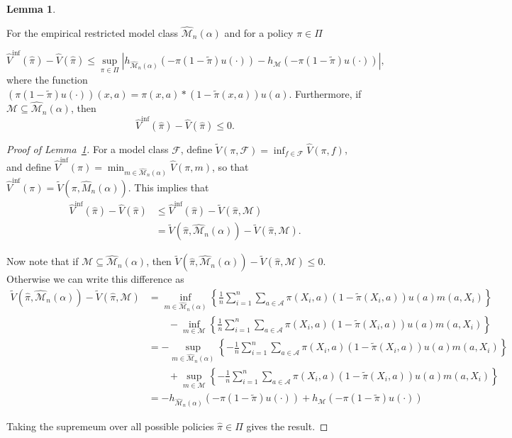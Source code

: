 \documentclass[12pt]{article}
\theoremstyle{definition}
\newtheorem{lemma}{Lemma}
\newcommand{\<}{\langle}
\renewcommand{\>}{\rangle}
\begin{document}
\begin{lemma}
  \label{lem:diff_support}

  For the empirical restricted model class $\widehat{\mathcal{M}}_n(\alpha)$ and for a policy $\pi \in \Pi$

  \[
    \hat{V}^{\inf}(\hat{\pi}) - \hat{V}(\hat{\pi})  \leq \sup_{\pi \in \Pi} |h_{\widehat{\mathcal{M}}_n(\alpha)}\left(-\pi (1 - \tilde{\pi}) u(\cdot)\right) - h_\mathcal{\mathcal{M}}\left(-\pi (1 - \tilde{\pi}) u(\cdot)\right)|,
  \]
  where the function $(\pi(1 - \tilde{\pi}) u(\cdot))(x, a) = \pi(x,a) * (1 - \tilde{\pi}(x, a)) u(a)$. Furthermore, if $\mathcal{M} \subseteq \widehat{\mathcal{M}}_n(\alpha)$, then 
  \[
    \hat{V}^{\inf}(\hat{\pi}) - \hat{V}(\hat{\pi})  \leq 0.
  \]

\end{lemma}

\begin{proof}[Proof of Lemma~\ref{lem:diff_support}]
  For a model class $\mathcal{F}$, define $\tilde{V}(\pi, \mathcal{F}) = \inf_{f \in \mathcal{F}} \hat{V}(\pi, f)$, and define $\hat{V}^{\inf}(\pi) = \min_{m \in \widehat{\mathcal{M}}_n(\alpha)} \hat{V}(\pi, m)$, so that $\hat{V}^{\inf}(\pi) = \tilde{V}(\pi, \widehat{M}_n(\alpha))$.
  This implies that
  \begin{align*}
    \hat{V}^{\inf}(\hat{\pi}) - \hat{V}(\hat{\pi}) & \leq \hat{V}^{\inf}(\hat{\pi}) - \tilde{V}(\hat{\pi}, \mathcal{M})\\
    & = \tilde{V}(\hat{\pi}, \widehat{\mathcal{M}}_n(\alpha)) - \tilde{V}(\hat{\pi}, \mathcal{M}).
  \end{align*}


  Now note that if $\mathcal{M} \subseteq \widehat{\mathcal{M}}_n(\alpha)$, then $\tilde{V}(\hat{\pi}, \widehat{\mathcal{M}}_n(\alpha)) - \tilde{V}(\hat{\pi}, \mathcal{M}) \leq 0$. Otherwise  we can write this difference as
  \begin{align*}
    \tilde{V}(\hat{\pi}, \widehat{\mathcal{M}}_n(\alpha)) - \tilde{V}(\hat{\pi}, \mathcal{M}) & = \inf_{m \in \widehat{\mathcal{M}}_n(\alpha)} \left\{ \frac{1}{n}\sum_{i=1}^n \sum_{a \in \mathcal{A}} \pi(X_i, a)(1 - \tilde{\pi}(X_i, a)) u(a) m(a, X_i) \right\}\\
    & \qquad - \inf_{m \in \mathcal{M}} \left\{ \frac{1}{n}\sum_{i=1}^n \sum_{a \in \mathcal{A}} \pi(X_i, a)(1 - \tilde{\pi}(X_i, a)) u(a) m(a, X_i) \right\}\\
    & = - \sup_{m \in \widehat{\mathcal{M}}_n(\alpha)} \left\{ - \frac{1}{n}\sum_{i=1}^n \sum_{a \in \mathcal{A}} \pi(X_i, a)(1 - \tilde{\pi}(X_i, a)) u(a) m(a, X_i) \right\}\\
    & \qquad + \sup_{m \in \mathcal{M}} \left\{- \frac{1}{n}\sum_{i=1}^n \sum_{a \in \mathcal{A}} \pi(X_i, a)(1 - \tilde{\pi}(X_i, a)) u(a) m(a, X_i) \right\}\\
    & = - h_{\widehat{\mathcal{M}}_n(\alpha)}(-\pi (1 - \tilde{\pi}) u(\cdot)) +  h_\mathcal{M}(-\pi (1 - \tilde{\pi}) u(\cdot))
  \end{align*}

  Taking the supremeum over all possible policies $\hat{\pi} \in \Pi$ gives the result.
\end{proof}
\end{document}
